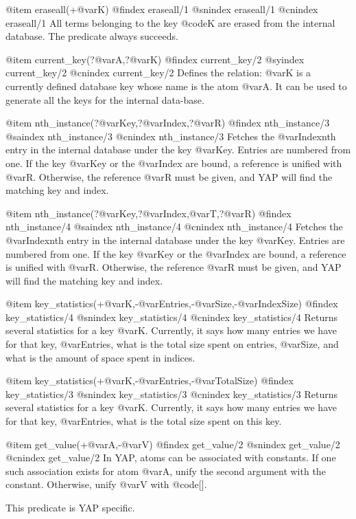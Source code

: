 {{{{{{@item eraseall(+@var{K})
@findex eraseall/1
@snindex eraseall/1
@cnindex eraseall/1
All terms belonging to the key @code{K} are erased from the internal
database. The predicate always succeeds.

@item current_key(?@var{A},?@var{K})
@findex current_key/2
@syindex current_key/2
@cnindex current_key/2
Defines the relation: @var{K} is a currently defined database key whose
name is the atom @var{A}. It can be used to generate all the keys for
the internal data-base.

@item nth_instance(?@var{Key},?@var{Index},?@var{R})
@findex nth_instance/3
@saindex nth_instance/3
@cnindex nth_instance/3
Fetches the @var{Index}nth entry in the internal database under the key
@var{Key}. Entries are numbered from one. If the key @var{Key} or the
@var{Index} are bound, a reference is unified with @var{R}. Otherwise,
the reference @var{R} must be given, and YAP will find
the matching key and index.


@item nth_instance(?@var{Key},?@var{Index},@var{T},?@var{R})
@findex nth_instance/4
@saindex nth_instance/4
@cnindex nth_instance/4
Fetches the @var{Index}nth entry in the internal database under the key
@var{Key}. Entries are numbered from one. If the key @var{Key} or the
@var{Index} are bound, a reference is unified with @var{R}. Otherwise,
the reference @var{R} must be given, and YAP will find
the matching key and index.

@item key_statistics(+@var{K},-@var{Entries},-@var{Size},-@var{IndexSize})
@findex key_statistics/4
@snindex key_statistics/4
@cnindex key_statistics/4
Returns several statistics for a key @var{K}. Currently, it says how
many entries we have for that key, @var{Entries}, what is the
total size spent on entries, @var{Size}, and what is the amount of
space spent in indices.

@item key_statistics(+@var{K},-@var{Entries},-@var{TotalSize})
@findex key_statistics/3
@snindex key_statistics/3
@cnindex key_statistics/3
Returns several statistics for a key @var{K}. Currently, it says how
many entries we have for that key, @var{Entries}, what is the
total size spent on this key.

@item get_value(+@var{A},-@var{V})
@findex get_value/2
@snindex get_value/2
@cnindex get_value/2
In YAP, atoms can be associated with constants. If one such
association exists for atom @var{A}, unify the second argument with the
constant. Otherwise, unify @var{V} with @code{[]}.

This predicate is YAP specific.

}}}}}}
